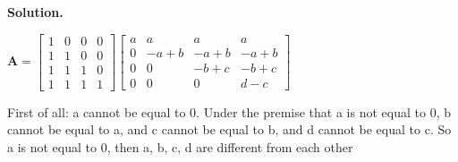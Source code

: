 \documentclass[english,onecolumn]{IEEEtran}
\begin{document}
\noindent \textbf{Solution.}

$\mathbf{A} = 
\begin{bmatrix}
	1 & 0 & 0 & 0\\
	1 & 1  & 0  & 0\\
	1 & 1 & 1& 0\\
	1 & 1 & 1& 1
\end{bmatrix}
\begin{bmatrix}
	a & a & a & a\\
	0 & -a+b & -a+b & -a+b\\
	0 & 0 & -b+c & -b+c\\
	0 & 0 & 0 & d-c
\end{bmatrix}
$

\par

First of all: a cannot be equal to 0. Under the premise that a is not equal to 0, b cannot be equal to a, and c cannot be equal to b, and d cannot be equal to c. So a is not equal to 0, then a, b, c, d are different from each other
\end{document}
